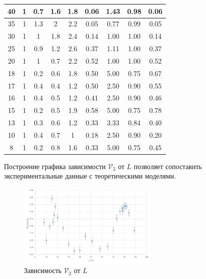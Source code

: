 \documentclass[a4paper]{article}
\begin{document}
\begin{longtable}[c]{|c|c|c|c|c|c|c|c|c|}
40     & 1     & 0.7   & 1.6   & 1.8   & 0.06          & 1.43     & 0.98            & 0.06            \\ \hline
35     & 1     & 1.3   & 2     & 2.2   & 0.05          & 0.77     & 0.99            & 0.05            \\ \hline
30     & 1     & 1     & 1.8   & 2.4   & 0.14          & 1.00     & 1.00            & 0.14            \\ \hline
25     & 1     & 0.9   & 1.2   & 2.6   & 0.37          & 1.11     & 1.00            & 0.37            \\ \hline
20     & 1     & 1     & 0.7   & 2.2   & 0.52          & 1.00     & 1.00            & 0.52            \\ \hline
18     & 1     & 0.2   & 0.6   & 1.8   & 0.50          & 5.00     & 0.75            & 0.67            \\ \hline
17     & 1     & 0.4   & 0.4   & 1.2   & 0.50          & 2.50     & 0.90            & 0.55            \\ \hline
16     & 1     & 0.4   & 0.5   & 1.2   & 0.41          & 2.50     & 0.90            & 0.46            \\ \hline
15     & 1     & 0.2   & 0.5   & 1.9   & 0.58          & 5.00     & 0.75            & 0.78            \\ \hline
13     & 1     & 0.3   & 0.6   & 1.2   & 0.33          & 3.33     & 0.84            & 0.40            \\ \hline
10     & 1     & 0.4   & 0.7   & 1     & 0.18          & 2.50     & 0.90            & 0.20            \\ \hline
8      & 1     & 0.2   & 0.8   & 1.6   & 0.33          & 5.00     & 0.75            & 0.45            \\ \hline
\end{longtable}

Построение графика зависимости $\mathcal{V}_2$ от $L$ позволяет сопоставить экспериментальные данные с теоретическими моделями.

\newpage

\begin{figure}[!h]
    \centering
    \includegraphics[width=0.6\textwidth]{4.png}
    \caption{Зависимость $\mathcal{V}_2$ от $L$}
\end{figure}
\end{document}
